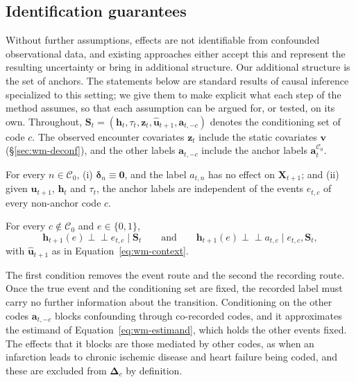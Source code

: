 \subsection{Identification guarantees}
\label{sec:wm-theory}

Without further assumptions, effects are not identifiable from confounded observational data, and existing approaches either accept this and represent the resulting uncertainty \citep{pace2024delphic} or bring in additional structure. Our additional structure is the set of anchors. The statements below are standard results of causal inference specialized to this setting; we give them to make explicit what each step of the method assumes, so that each assumption can be argued for, or tested, on its own. Throughout, $\mathbf{S}_t=(\mathbf{h}_t,\tau_t,\mathbf{z}_t,\hat{\mathbf{u}}_{t+1},\mathbf{a}_{t,-c})$ denotes the conditioning set of code $c$. The observed encounter covariates $\mathbf{z}_t$ include the static covariates $\mathbf{v}$ (\S\ref{sec:wm-deconf}), and the other labels $\mathbf{a}_{t,-c}$ include the anchor labels $\mathbf{a}^{\mathcal{C}_0}_t$.

\begin{assumption}
\label{ass:wm-anchors}
For every $n\in\mathcal{C}_0$, (i) $\boldsymbol{\delta}_n\equiv\mathbf{0}$, and the label $a_{t,n}$ has no effect on $\mathbf{X}_{t+1}$; and (ii) given $\mathbf{u}_{t+1}$, $\mathbf{h}_t$ and $\tau_t$, the anchor labels are independent of the events $e_{t,c}$ of every non-anchor code $c$.
\end{assumption}

\begin{assumption}
\label{ass:wm-sufficiency}
For every $c\notin\mathcal{C}_0$ and $e\in\{0,1\}$,
\[
\mathbf{h}_{t+1}(e)\perp\!\!\!\perp e_{t,c}\mid\mathbf{S}_t
\qquad\text{and}\qquad
\mathbf{h}_{t+1}(e)\perp\!\!\!\perp a_{t,c}\mid e_{t,c},\mathbf{S}_t,
\]
with $\hat{\mathbf{u}}_{t+1}$ as in Equation~\eqref{eq:wm-context}.
\end{assumption}

The first condition removes the event route and the second the recording route. Once the true event and the conditioning set are fixed, the recorded label must carry no further information about the transition. Conditioning on the other codes $\mathbf{a}_{t,-c}$ blocks confounding through co-recorded codes, and it approximates the estimand of Equation~\eqref{eq:wm-estimand}, which holds the other events fixed. The effects that it blocks are those mediated by other codes, as when an infarction leads to chronic ischemic disease and heart failure being coded, and these are excluded from $\boldsymbol{\Delta}_c$ by definition.

